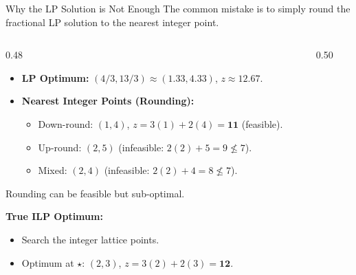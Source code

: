\documentclass[aspectratio=169]{beamer}
\begin{document}
\begin{frame}{Why the LP Solution is Not Enough}
  \footnotesize
  The common mistake is to simply round the fractional LP solution to the nearest integer point.

  \vspace{0.2em}
  \begin{columns}[T]
    \begin{column}{0.48\textwidth}
      \begin{itemize}
        \item \textbf{LP Optimum:} $(4/3,13/3)\approx(1.33,4.33)$, $z\approx12.67$.
        \item \textbf{Nearest Integer Points (Rounding):}
        \begin{itemize}
          \item Down-round: $(1,4)$, $z=3(1)+2(4)=\mathbf{11}$ (feasible).
          \item Up-round: $(2,5)$ (infeasible: $2(2)+5=9 \not\le 7$).
          \item Mixed: $(2,4)$ (infeasible: $2(2)+4=8 \not\le 7$).
        \end{itemize}
      \end{itemize}
      \vspace{0.3em}
      \alert{Rounding can be feasible but sub-optimal.}

      \vspace{0.3em}
      \textbf{True ILP Optimum:}
      \begin{itemize}
        \item Search the integer lattice points.
        \item Optimum at $\star$: $(2,3)$, $z=3(2)+2(3)=\mathbf{12}$.
      \end{itemize}
    \end{column}
    \begin{column}{0.50\textwidth}
      \centering
\end{column}
\end{columns}
\end{frame}
\end{document}
